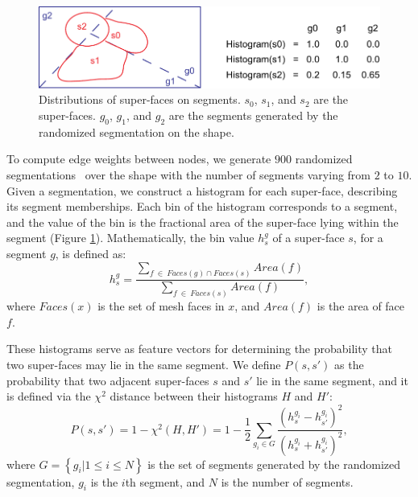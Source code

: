 \begin{figure}[b]\centering
\includegraphics[width=1.0\linewidth]{./Material/Consistency.pdf}
\caption{Distributions of super-faces on segments. $s_0$, $s_1$, and $s_2$ are the super-faces. $g_0$, $g_1$, and $g_2$ are the segments generated by the randomized segmentation on the shape.}\label{fig:Consistency}
\end{figure}

To compute edge weights between nodes, we generate $900$ randomized segmentations~\cite{randomizedcutsfunkhousertog2008} over the shape with the number of segments varying from $2$ to $10$. Given a segmentation, we construct a histogram for each super-face, describing its segment memberships. Each bin of the histogram corresponds to a segment, and the value of the bin is the fractional area of the super-face lying within the segment (Figure \ref{fig:Consistency}). Mathematically, the bin value $h_s^g$ of a super-face $s$, for a segment $g$, is defined as:
\[h_s^g = \frac{{\sum\limits_{f ~\in~ Faces(g) \cap Faces(s)} {Area\left( {f} \right)} }}{{\sum\limits_{f ~\in~ Faces(s)} {Area\left( {f} \right)} }},\]
where $Faces(x)$ is the set of mesh faces in $x$, and $Area(f)$ is the area of face $f$.

These histograms serve as feature vectors for determining the probability that two super-faces may lie in the same segment. We define $P(s,s')$ as the probability that two adjacent super-faces $s$ and $s'$ lie in the same segment, and it is defined via the ${\chi ^2}$ distance between their histograms $H$ and $H'$:
\[{P}\left( {s,s'} \right) = 1 - {\chi ^2}\left( {H,H'} \right) = 1 - \frac{1}{2}\sum\limits_{{g_i} \in G} {\frac{{{{\left( {h_s^{{g_i}} - h_{s'}^{{g_i}}} \right)}^2}}}{{{{\left( {h_s^{{g_i}} + h_{s'}^{{g_i}}} \right)}^2}}}}, \]
where $G = \left\{ {{g_i}\left| {1 \le i \le N} \right.} \right\}$ is the set of segments generated by the randomized segmentation, $g_i$ is the $i$th segment, and $N$ is the number of segments.


